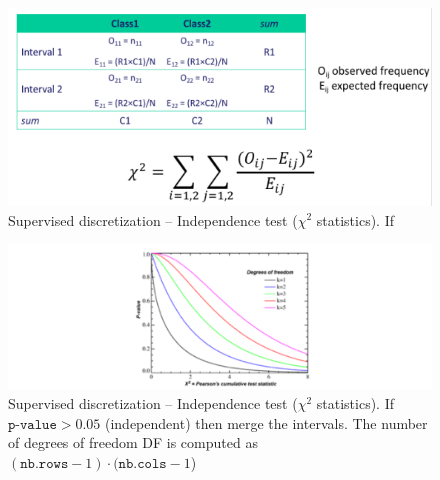     \begin{figure}[htp]
      \centering
        \includegraphics[width=.6\textwidth]{images/supdisc.png}
        \caption{Supervised discretization -- Independence test ($\chi^2$ statistics). If }
        \label{fig:supdisc}
    \end{figure}
    \begin{figure}[htp]
      \centering
        \includegraphics[width=.6\textwidth]{images/supdisc2.png}
        \caption{Supervised discretization -- Independence test ($\chi^2$ statistics). If $\texttt{p-value}>0.05$  (independent) then merge the intervals. The number of degrees of freedom DF is computed as $(\texttt{nb.rows}-1)\cdot(\texttt{nb.cols}-1$)}
        \label{fig:supdisc2}
    \end{figure}

